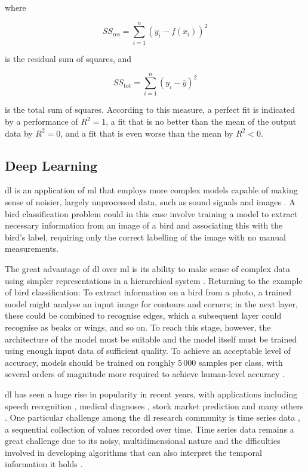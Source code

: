 where

\[
    SS_{\text{res}} = \sum_{i=1}^{n}{\left(y_i - f(x_i)\right)}^2
\]

is the residual sum of squares, and

\[
    SS_{\text{tot}} = \sum_{i=1}^{n}{\left(y_i - \bar{y}\right)}^2
\]

is the total sum of squares. According to this measure, a perfect fit is indicated by a performance of \(R^2 = 1\), a fit that is no better than the mean of the output data by \(R^2 = 0\), and a fit that is even worse than the mean by \(R^2 < 0\).

\subsection{Deep Learning}
\ac{dl} is an application of \ac{ml} that employs more complex models capable of making sense of noisier, largely unprocessed data, such as sound signals and images \cite[]{goodfellow_deep_2016}. A bird classification problem could in this case involve training a model to extract necessary information from an image of a bird and associating this with the bird's label, requiring only the correct labelling of the image with no manual measurements.

The great advantage of \ac{dl} over \ac{ml} is its ability to make sense of complex data using simpler representations in a hierarchical system \cite[]{goodfellow_deep_2016}. Returning to the example of bird classification: To extract information on a bird from a photo, a trained model might analyse an input image for contours and corners; in the next layer, these could be combined to recognise edges, which a subsequent layer could recognise as beaks or wings, and so on. To reach this stage, however, the architecture of the model must be suitable and the model itself must be trained using enough input data of sufficient quality. To achieve an acceptable level of accuracy, models should be trained on roughly 5\,000 samples per class, with several orders of magnitude more required to achieve human-level accuracy \cite[p. 20]{goodfellow_deep_2016}.

\ac{dl} has seen a huge rise in popularity in recent years, with applications including speech recognition \cite[]{deng_machine_2013}, medical diagnoses \cite[]{lee_diagnosis_2018}, stock market prediction \cite[]{krollner_financial_2010} and many others \cite[]{kelleher_fundamentals_2015}. One particular challenge among the \ac{dl} research community is time series data \cite[]{yang_10_2006}, a sequential collection of values recorded over time. Time series data remains a great challenge due to its noisy, multidimensional nature \cite[]{kelleher_fundamentals_2015} and the dfficulties involved in developing algorithms that can also interpret the temporal information it holds \cite[]{bagnall_great_2017}.

